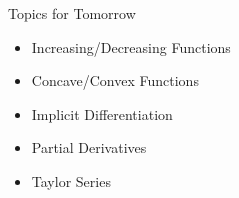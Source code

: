 \documentclass[aspectratio=169]{beamer}
\begin{document}
\begin{frame}{Topics for Tomorrow}\label{main1}

\begin{itemize}
	\begin{itemize}
		\item Increasing/Decreasing Functions
		\item Concave/Convex Functions
		\item Implicit Differentiation
		\item Partial Derivatives
		\item Taylor Series
	\end{itemize}
\end{itemize}
\end{frame}
\end{document}
